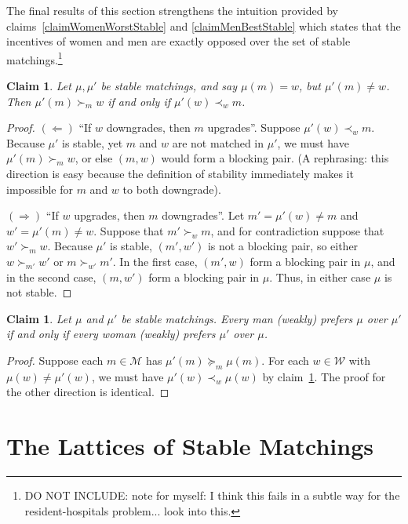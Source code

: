 \documentclass[12pt]{article}
\newcommand{\M}{\mathcal{M}}
\newcommand{\W}{\mathcal{W}}
\newtheorem{claim}[definition]{Claim}
\begin{document}
  The final results of this section strengthens the intuition provided by
  claims~\ref{claimWomenWorstStable} and \ref{claimMenBestStable} which states
  that the incentives of women and men are exactly opposed over the set of
  stable matchings.\footnote{
    DO NOT INCLUDE: note for myself: I think this fails in a subtle way for the
    resident-hospitals problem... look into this.
  }
  \begin{claim}\label{claimOneUpOneDown}
    Let $\mu, \mu'$ be stable matchings, and say $\mu(m) = w$, but $\mu'(m)\ne w$.
    Then $\mu'(m) \succ_m w$ if and only if $\mu'(w) \prec_w m$.
  \end{claim}
  \begin{proof}
    $(\Leftarrow)$ ``If $w$ downgrades, then $m$ upgrades''.
    Suppose $\mu'(w) \prec_w m$. Because $\mu'$ is stable, yet $m$ and $w$
    are not matched in $\mu'$, we must have $\mu'(m) \succ_m w$,
    or else $(m,w)$ would form a blocking pair.
    (A rephrasing: this direction is easy because the definition of stability
    immediately makes it impossible for $m$ and $w$ to both downgrade).

    $(\Rightarrow)$ ``If $w$ upgrades, then $m$ downgrades''.
    Let $m' = \mu'(w) \ne m$ and $w' = \mu'(m) \ne w$.
    Suppose that $m' \succ_w m$, and for contradiction suppose that $w' \succ_m w$.
    Because $\mu'$ is stable, $(m', w')$ is not a blocking pair,
    so either $w\succ_{m'} w'$ or $m\succ_{w'} m'$.
    In the first case, $(m',w)$ form a blocking pair in $\mu$,
    and in the second case, $(m,w')$ form a blocking pair in $\mu$.
    Thus, in either case $\mu$ is not stable.
  \end{proof}
  \begin{claim}\label{claimDominateOposites}
    Let $\mu$ and $\mu'$ be stable matchings.
    Every man (weakly) prefers $\mu$ over $\mu'$ if and only if 
    every woman (weakly) prefers $\mu'$ over $\mu$.
  \end{claim}
  \begin{proof}
    Suppose each $m\in\M$ has $\mu'(m)\succeq_m\mu(m)$.
    For each $w\in\W$ with $\mu(w)\ne\mu'(w)$, we must have
    $\mu'(w)\prec_w \mu(w)$ by claim~\ref{claimOneUpOneDown}.
    The proof for the other direction is identical.
  \end{proof}

\section{The Lattices of Stable Matchings}
\end{document}
